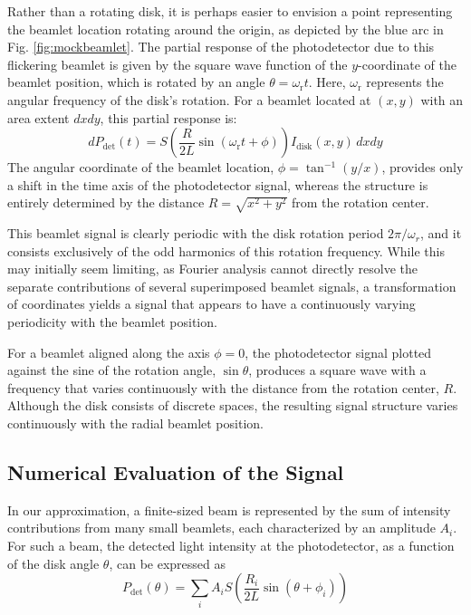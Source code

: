 \documentclass[8pt,a4paper]{report}
\begin{document}
	Rather than a rotating disk, it is perhaps easier to envision a point representing the beamlet location rotating around the origin, as depicted by the blue arc in Fig. \ref{fig:mockbeamlet}. The partial response of the photodetector due to this flickering beamlet is given by the square wave function of the $y$-coordinate of the beamlet position, which is rotated by an angle $\theta = \omega_\mathrm{r} t$. Here, $\omega_\mathrm{r}$ represents the angular frequency of the disk's rotation. For a beamlet located at $(x,y)$ with an area extent $dxdy$, this partial response is:
	\begin{equation} \label{mock_beamlet}
		dP_\mathrm{det}(t) = S\left(\frac{R}{2L}\sin\left(\omega_\mathrm{r} t + \phi\right)\right) I_\mathrm{disk}(x,y)\,dx dy
	\end{equation}
	The angular coordinate of the beamlet location, $\phi = \tan^{-1} (y/x)$, provides only a shift in the time axis of the photodetector signal, whereas the structure is entirely determined by the distance $R = \sqrt{x^2 + y^2}$ from the rotation center.
	
	This beamlet signal is clearly periodic with the disk rotation period $2\pi/\omega_r$, and it consists exclusively of the odd harmonics of this rotation frequency. While this may initially seem limiting, as Fourier analysis cannot directly resolve the separate contributions of several superimposed beamlet signals, a transformation of coordinates yields a signal that appears to have a continuously varying periodicity with the beamlet position.
	
	For a beamlet aligned along the axis $\phi=0$, the photodetector signal plotted against the sine of the rotation angle, $\sin\theta$, produces a square wave with a frequency that varies continuously with the distance from the rotation center, $R$. Although the disk consists of discrete spaces, the resulting signal structure varies continuously with the radial beamlet position.
	
	
	\subsection{Numerical Evaluation of the Signal}
	
	In our approximation, a finite-sized beam is represented by the sum of intensity contributions from many small beamlets, each characterized by an amplitude $A_i$. For such a beam, the detected light intensity at the photodetector, as a function of the disk angle $\theta$, can be expressed as
	\begin{equation} \label{mock_beamSum}
		P_\mathrm{det}(\theta) = \sum_i A_i S\left(\frac{R_i}{2L}\sin\left(\theta + \phi_i\right)\right)
	\end{equation}
	
\end{document}
